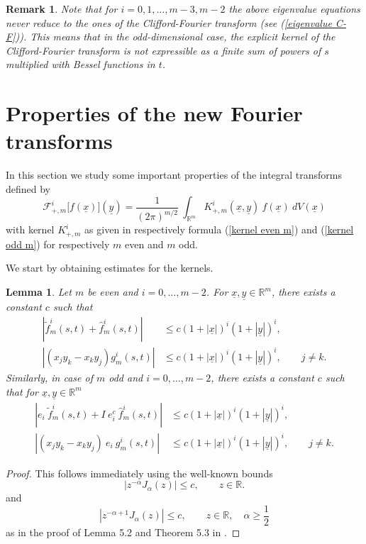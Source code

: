 \documentclass{amsart}
\newtheorem{lemma}[theorem]{Lemma}
\newtheorem{remark}[theorem]{Remark}
\theoremstyle{remark}
\begin{document}
\begin{remark}
Note that for $i=0,1,\ldots,m-3,m-2$ the above eigenvalue equations never reduce to the ones of the Clifford-Fourier transform (see (\ref{eigenvalue C-F})). This means that in the odd-dimensional case, the explicit kernel of the Clifford-Fourier transform is not expressible as a finite sum of powers of $s$ multiplied with Bessel functions in $t$.
\end{remark}
\section{Properties of the new Fourier transforms}
\setcounter{equation}{0}
\label{Properties}

In this section we study some important properties of the integral transforms defined by
\[
\mathcal{F}^{i}_{+,m} \lbrack f({\underline{x}}) \rbrack ({\underline{y}}) = \frac{1}{(2 \pi)^{m/2}} \  \int_{\mathbb{R}^m} K^{i}_{+,m}({\underline{x}},{\underline{y}}) \ f({\underline{x}}) \ dV({\underline{x}})
\]
with kernel $K^{i}_{+,m}$ as given in respectively formula (\ref{kernel even m}) and (\ref{kernel odd m}) for respectively $m$ even and $m$ odd.

We start by obtaining estimates for the kernels.
\begin{lemma}
\label{bounds}
Let $m$ be even and $i= 0, \ldots, m-2$. For $ {\underline{x}}, {\underline{y}} \in {{\mathbb R}}^m$, there exists a constant $c$ such that
\begin{align*}
|\tilde{f}_m^i(s,t)  + \hat{f}_m^i(s,t) | &\leq  c (1+|{\underline{x}}|)^{i}(1+|{\underline{y}}|)^{i},  \\
|(x_{j} y_{k} - x_{k}y_{j}) g_m^i(s,t)| &\leq  c (1+|{\underline{x}}|)^{i}(1+|{\underline{y}}|)^{i}, \qquad
 j \neq k. 
\end{align*}
Similarly, in case of $m$ odd and $i=0,\ldots,m-2$, there exists a constant $c$ such that for $ {\underline{x}}, {\underline{y}} \in {{\mathbb R}}^m$
\begin{align*}
|e_i \ \tilde{f}_m^i(s,t)  + I \ e_i^c \ \hat{f}_m^i(s,t) | &\leq  c (1+|{\underline{x}}|)^{i}(1+|{\underline{y}}|)^{i},  \\
|(x_{j} y_{k} - x_{k}y_{j}) \ e_i \  g_m^i(s,t)| &\leq  c (1+|{\underline{x}}|)^{i}(1+|{\underline{y}}|)^{i}, \qquad
 j \neq k. 
\end{align*}
\end{lemma}
\begin{proof}
This follows immediately using the well-known bounds
$$
    |  z^{-{{\alpha}}} J_{{\alpha}}(z) | \le c, \qquad z \in  {{\mathbb R}}. 
$$
and
$$
       |  z^{-{{\alpha}} + 1} J_{{\alpha}}(z) | \le c, \qquad z \in  {{\mathbb R}}, \quad {{\alpha}} \geq \frac{1}{2} 
$$
as in the proof of Lemma 5.2 and Theorem 5.3 in \cite{DBXu}.
\end{proof}
\end{document}

